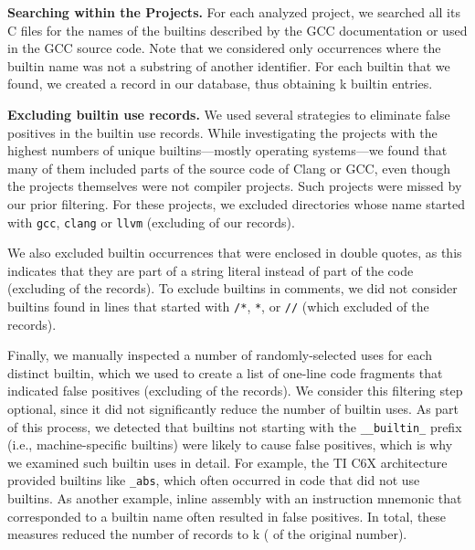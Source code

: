 \documentclass[sigconf,screen]{acmart}
\renewcommand{\paragraph}[1]{\textbf{#1}}
\newcommand\code[1]{\texttt{#1}}
\begin{document}
\paragraph{Searching within the Projects.}
For each analyzed project, we searched all its C files for the names of the \nrTotalTerms{}
builtins described by the GCC documentation or used in the GCC source code.
Note that we considered only occurrences where the builtin name was not a substring of another identifier.
For each builtin that we found, we created a record in our database, thus obtaining \kBuiltinsUnfiltered{}k builtin entries.

\paragraph{Excluding builtin use records.}
We used several strategies to eliminate false positives in the builtin use records.
While investigating the projects with the highest numbers of unique builtins---mostly operating systems---we found that many of them included parts of the source code of Clang or GCC, even though the projects themselves were not compiler projects. Such projects were missed by our prior filtering.
For these projects, we excluded directories whose name started with \code{gcc}, \code{clang} or \code{llvm} (excluding \percentageFilteredByCompilerDirectories{} of our records).

We also excluded builtin occurrences that were enclosed in double quotes,
as this indicates that they are part of a string literal instead of part of the code (excluding \percentageRemovedByDoubleQuotes{} of the records).
To exclude builtins in comments, we did not consider builtins found in lines that started with \code{/*}, \code{*}, or \code{//} (which excluded \percentageBuiltinFilteredByComments{} of the records).

Finally, we manually inspected a number of randomly-selected uses for each distinct builtin, which we used to create a list of \nrBlacklist{} one-line code fragments that indicated false positives (excluding \percentageFilteredByBlacklist{} of the records).
We consider this filtering step optional, since it did not significantly reduce the number of builtin uses.
As part of this process, we detected that builtins not starting with the \code{\_\_builtin\_} prefix (i.e., machine-specific builtins) were likely to cause false positives, which is why we examined such builtin uses in detail.
For example, the TI C6X architecture provided builtins like \code{\_abs}, which often occurred in code that did not use builtins.
As another example, inline assembly with an instruction mnemonic that corresponded to a builtin name often resulted in false positives.
In total, these measures reduced the number of records to \kBuiltins{}k (\percentageFilteredBuiltins{} of the original number).
\end{document}

